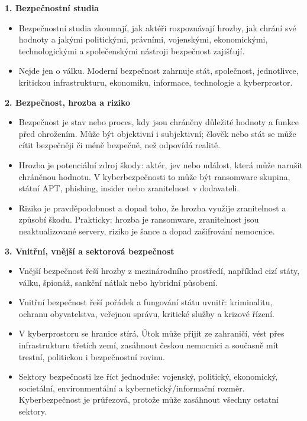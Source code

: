 \documentclass[11pt,a4paper]{article}
\begin{document}
\textbf{1. Bezpečnostní studia}
\begin{itemize}
  \item Bezpečnostní studia zkoumají, jak aktéři rozpoznávají hrozby, jak chrání své hodnoty a jakými politickými, právními, vojenskými, ekonomickými, technologickými a společenskými nástroji bezpečnost zajišťují.
  \item Nejde jen o válku. Moderní bezpečnost zahrnuje stát, společnost, jednotlivce, kritickou infrastrukturu, ekonomiku, informace, technologie a kyberprostor.
\end{itemize}

\textbf{2. Bezpečnost, hrozba a riziko}
\begin{itemize}
  \item Bezpečnost je stav nebo proces, kdy jsou chráněny důležité hodnoty a funkce před ohrožením. Může být objektivní i subjektivní; člověk nebo stát se může cítit bezpečněji či méně bezpečně, než odpovídá realitě.
  \item Hrozba je potenciální zdroj škody: aktér, jev nebo událost, která může narušit chráněnou hodnotu. V kyberbezpečnosti to může být ransomware skupina, státní APT, phishing, insider nebo zranitelnost v dodavateli.
  \item Riziko je pravděpodobnost a dopad toho, že hrozba využije zranitelnost a způsobí škodu. Prakticky: hrozba je ransomware, zranitelnost jsou neaktualizované servery, riziko je šance a dopad zašifrování nemocnice.
\end{itemize}

\textbf{3. Vnitřní, vnější a sektorová bezpečnost}
\begin{itemize}
  \item Vnější bezpečnost řeší hrozby z mezinárodního prostředí, například cizí státy, válku, špionáž, sankční nátlak nebo hybridní působení.
  \item Vnitřní bezpečnost řeší pořádek a fungování státu uvnitř: kriminalitu, ochranu obyvatelstva, veřejnou správu, kritické služby a krizové řízení.
  \item V kyberprostoru se hranice stírá. Útok může přijít ze zahraničí, vést přes infrastrukturu třetích zemí, zasáhnout českou nemocnici a současně mít trestní, politickou i bezpečnostní rovinu.
  \item Sektory bezpečnosti lze říct jednoduše: vojenský, politický, ekonomický, societální, environmentální a kybernetický/informační rozměr. Kyberbezpečnost je průřezová, protože může zasáhnout všechny ostatní sektory.
\end{itemize}
\end{document}

